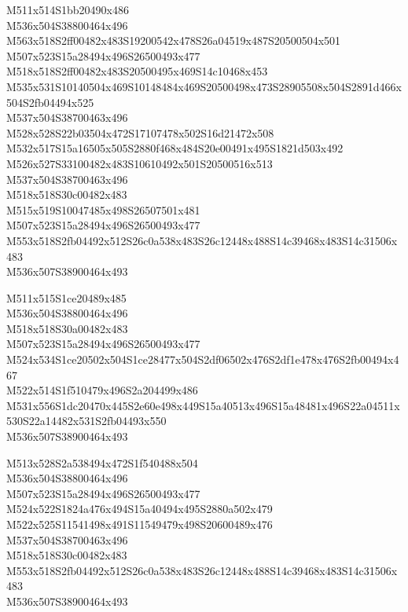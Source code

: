 \documentclass{article}
\begin{document}
\begin{multicols}{5}
\begin{center}
M511x514S1bb20490x486 %
\\M536x504S38800464x496 %
\\M563x518S2ff00482x483S19200542x478S26a04519x487S20500504x501 %
\\M507x523S15a28494x496S26500493x477 %
\\M518x518S2ff00482x483S20500495x469S14c10468x453 %
\\M535x531S10140504x469S10148484x469S20500498x473S28905508x504S2891d466x504S2fb04494x525 %
\\M537x504S38700463x496 %
\\M528x528S22b03504x472S17107478x502S16d21472x508 %
\\M532x517S15a16505x505S2880f468x484S20e00491x495S1821d503x492 %
\\M526x527S33100482x483S10610492x501S20500516x513 %
\\M537x504S38700463x496 %
\\M518x518S30c00482x483 %
\\M515x519S10047485x498S26507501x481 %
\\M507x523S15a28494x496S26500493x477 %
\\M553x518S2fb04492x512S26c0a538x483S26c12448x488S14c39468x483S14c31506x483 %
\\M536x507S38900464x493 %
\vfil
\columnbreak

M511x515S1ce20489x485 %
\\M536x504S38800464x496 %
\\M518x518S30a00482x483 %
\\M507x523S15a28494x496S26500493x477 %
\\M524x534S1ce20502x504S1ce28477x504S2df06502x476S2df1e478x476S2fb00494x467 %
\\M522x514S1f510479x496S2a204499x486 %
\\M531x556S1dc20470x445S2e60e498x449S15a40513x496S15a48481x496S22a04511x530S22a14482x531S2fb04493x550 %
\\M536x507S38900464x493 %
\vfil
\columnbreak

M513x528S2a538494x472S1f540488x504 %
\\M536x504S38800464x496 %
\\M507x523S15a28494x496S26500493x477 %
\\M524x522S1824a476x494S15a40494x495S2880a502x479 %
\\M522x525S11541498x491S11549479x498S20600489x476 %
\\M537x504S38700463x496 %
\\M518x518S30c00482x483 %
\\M553x518S2fb04492x512S26c0a538x483S26c12448x488S14c39468x483S14c31506x483 %
\\M536x507S38900464x493 %
\vfil

\end{center}
\end{multicols}
\end{document}
